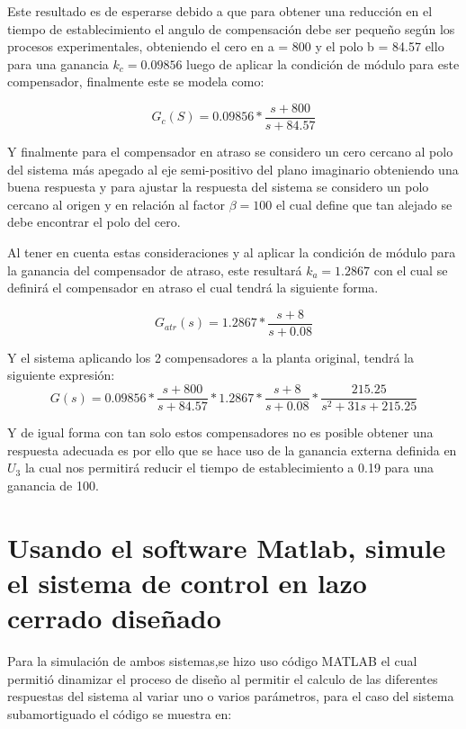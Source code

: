 \documentclass[conference]{IEEEtran}
\begin{document}
	Este resultado es de esperarse debido a que para obtener una reducción en el tiempo de establecimiento el angulo de compensación debe ser pequeño según los procesos experimentales, obteniendo el cero en a = 800 y el polo b = 84.57 ello para una ganancia $k_c = 0.09856$ luego de aplicar la condición de módulo para este compensador, finalmente este se modela como:
	
	\begin{equation}
		G_c(S) = 0.09856*\frac{s + 800}{s + 84.57}
	\end{equation}
	
	Y finalmente para el compensador en atraso se considero un cero cercano al polo del sistema más apegado al eje semi-positivo del plano imaginario obteniendo una buena respuesta y para ajustar la respuesta del sistema se considero un polo cercano al origen y en relación al factor $\beta = 100$ el cual define que tan alejado se debe encontrar el polo del cero.
	
	Al tener en cuenta estas consideraciones y al aplicar la condición de módulo para la ganancia del compensador de atraso, este resultará $k_a = 1.2867$ con el cual se definirá el compensador en atraso el cual tendrá la siguiente forma.
	
	\begin{equation}
		G_{atr}(s) = 1.2867*\frac{s + 8}{s + 0.08}
		\label{eq:compensador-atr-sobre}
	\end{equation}
	
	Y el sistema aplicando los 2 compensadores a la planta original, tendrá la siguiente expresión:
	\begin{equation}
		G(s) = 0.09856*\frac{s + 800}{s + 84.57}*1.2867*\frac{s + 8}{s + 0.08}*\frac{215.25}{s^2 + 31s + 215.25}
		\label{eq:compensador-adelanto-atr-sobre}
	\end{equation}
	
	Y de igual forma con tan solo estos compensadores no es posible obtener una respuesta adecuada es por ello que se hace uso de la ganancia externa definida en $U_3$ la cual nos permitirá reducir el tiempo de establecimiento a 0.19 para una ganancia de 100.
	
	\section{Usando el software Matlab, simule el sistema de control en lazo cerrado diseñado}
	Para la simulación de ambos sistemas,se hizo uso código MATLAB el cual permitió dinamizar el proceso de diseño al permitir el calculo de las diferentes respuestas del sistema al variar uno o varios parámetros, para el caso del sistema subamortiguado el código se muestra en:
	
\end{document}

